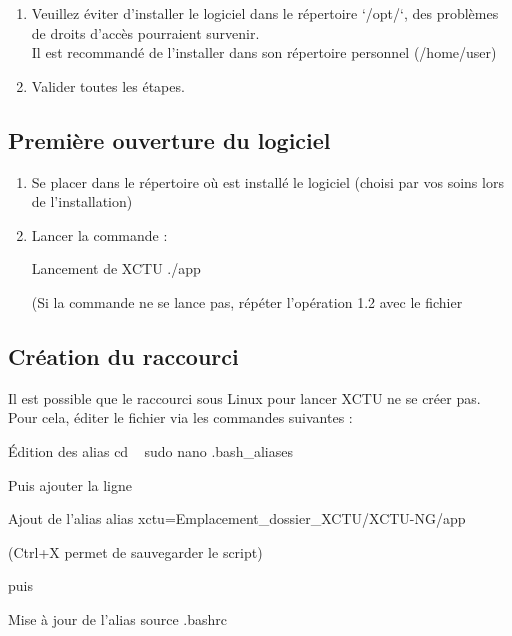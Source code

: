 {\begin{enumerate}
    \item Veuillez éviter d'installer le logiciel dans le répertoire `/opt/`, des problèmes de droits d'accès pourraient survenir. \\
    Il est recommandé de l'installer dans son répertoire personnel (/home/user)

    \item Valider toutes les étapes. 

\end{enumerate}

\subsection{Première ouverture du logiciel}

\begin{enumerate}

    \item Se placer dans le répertoire où est installé le logiciel (choisi par vos soins lors de l'installation) 

\item Lancer la commande :
\begin{Bash}{Lancement de XCTU}
./app
\end{Bash}

(Si la commande ne se lance pas, répéter l'opération 1.2 avec le fichier 
    
\end{enumerate}

\subsection{Création du raccourci}

Il est possible que le raccourci sous Linux pour lancer XCTU ne se créer pas. Pour cela, éditer le fichier  via les commandes suivantes : 

\begin{Bash}{Édition des alias}
cd ~
sudo nano .bash_aliases
\end{Bash}

Puis ajouter la ligne 
\begin{Bash}{Ajout de l'alias}
alias xctu=Emplacement_dossier_XCTU/XCTU-NG/app
\end{Bash}
(Ctrl+X permet de sauvegarder le script)

puis 
\begin{Bash}{Mise à jour de l'alias}
source .bashrc
\end{Bash}

}
